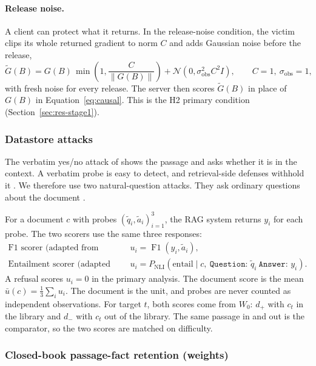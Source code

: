 \documentclass[11pt]{article}
\newcommand{\Fone}{\operatorname{F1}}
\begin{document}
\paragraph{Release noise.} A client can protect what it returns. In the release-noise condition, the victim clips its whole returned gradient to norm $C$ and adds Gaussian noise before the release,
\begin{equation}
  \tilde G(B)=G(B)\,\min\!\left(1,\frac{C}{\|G(B)\|}\right)+\mathcal N\!\left(0,\sigma_{\mathrm{obs}}^2C^2I\right),
  \qquad C=1,\ \sigma_{\mathrm{obs}}=1,
  \label{eq:release-noise}
\end{equation}
with fresh noise for every release. The server then scores $\tilde G(B)$ in place of $G(B)$ in Equation~\eqref{eq:causal}. This is the H2 primary condition (Section~\ref{sec:res-stage1}).

\subsubsection{Datastore attacks}\label{sec:nq}

The verbatim yes/no attack of \citet{anderson2024membership} shows the passage and asks whether it is in the context. A verbatim probe is easy to detect, and retrieval-side defenses withhold it \citep{choi2025mirabel}. We therefore use two natural-question attacks. They ask ordinary questions about the document \citep{naseh2025riddle,nguyen2026menta}.

For a document $c$ with probes $(\tilde q_i,\tilde a_i)_{i=1}^{3}$, the RAG system returns $y_i$ for each probe. The two scorers use the same three responses:
\begin{align}
  \text{F1 scorer (adapted from Riddle Me This):}\quad & u_i=\Fone(y_i,\tilde a_i), \label{eq:nq-f1}\\
  \text{Entailment scorer (adapted from MEntA):}\quad & u_i=P_{\mathrm{NLI}}\!\left(\text{entail}\mid c,\ \texttt{Question: }\tilde q_i\ \texttt{Answer: }y_i\right). \label{eq:nq-nli}
\end{align}
A refusal scores $u_i=0$ in the primary analysis. The document score is the mean $\bar u(c)=\frac13\sum_i u_i$. The document is the unit, and probes are never counted as independent observations. For target $t$, both scores come from $W_0$: $d_{+}$ with $c_t$ in the library and $d_{-}$ with $c_t$ out of the library. The same passage in and out is the comparator, so the two scores are matched on difficulty.

\subsubsection{Closed-book passage-fact retention (weights)}\label{sec:retention}
\end{document}
